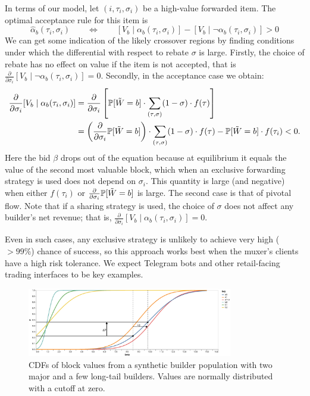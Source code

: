 In terms of our model, let $(i,\tau_i,\sigma_i)$ be a high-value forwarded item.
%
The optimal acceptance rule for this item is
%
\[
  \hat{\alpha}_b(\tau_i,\sigma_i) \qquad \Leftrightarrow \qquad [V_b\mid\alpha_b(\tau_i,\sigma_i)] - [V_b\mid \neg \alpha_b(\tau_i,\sigma_i)] > 0
\]
%
We can get some indication of the likely crossover regions by finding conditions under which the differential with respect to rebate $\sigma$ is large.
%
Firstly, the choice of rebate has no effect on value if the item is not accepted, that is $\frac{\partial}{\partial\sigma_i}[V_b\mid \neg \alpha_b(\tau_i,\sigma_i)] = 0$.
%
Secondly, in the acceptance case we obtain:
%
\begin{align*}
  \frac{\partial}{\partial\sigma_i}[V_b\mid\alpha_b(\tau_i,\sigma_i)] &= 
    \frac{\partial}{\partial\sigma_i}\left[ \mathbb{P}[\tilde{W}=b]\cdot \sum_{(\tau,\sigma)}(1-\sigma)\cdot f(\tau) \right] \\
    &= \left(\frac{\partial}{\partial\sigma_i}\mathbb{P}[\tilde{W}=b]\right)\cdot \sum_{(\tau,\sigma)}(1-\sigma)\cdot f(\tau)  - 
    \mathbb{P}[\tilde{W}=b]\cdot f(\tau_i) < 0.
\end{align*}
%
Here the bid $\beta$ drops out of the equation because at equilibrium it equals the value of the second most valuable block, which when an exclusive forwarding strategy is used does not depend on $\sigma_i$.
%
This quantity is large (and negative) when either $f(\tau_i)$ or $\frac{\partial}{\partial\sigma_i}\mathbb{P}[\tilde{W}=b]$ is large.
%
The second case is that of pivotal flow.
%
Note that if a sharing strategy is used, the choice of $\sigma$ does not affect any builder's net revenue; that is, $\frac{\partial}{\partial\sigma_i}[V_b\mid\alpha_b(\tau_i,\sigma_i)]=0$.

Even in such cases, any exclusive strategy is unlikely to achieve very high ($>99\%$) chance of success, so this approach works best when the muxer's clients have a high risk tolerance.
%
We expect Telegram bots and other retail-facing trading interfaces to be key examples.

\begin{figure}
    \begin{center}
        \includegraphics[width=0.8\textwidth]{eps/pivotal}
        \caption{CDFs of block values from a synthetic builder population with two major and a few long-tail builders. Values are normally distributed with a cutoff at zero.}
    
        \label{fig:pivotal}
    \end{center}
    
\end{figure}

